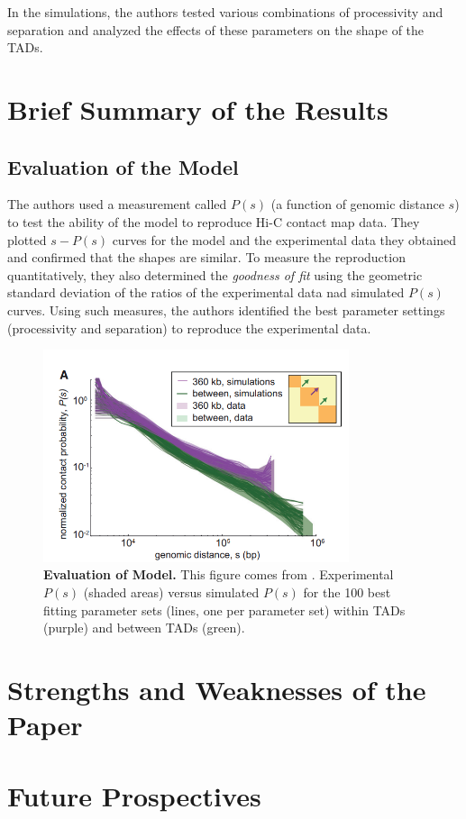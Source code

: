 \documentclass[11pt]{article}
\begin{document}
In the simulations, the authors tested various combinations of processivity and separation and analyzed the effects of these parameters on the shape of the TADs.

\section{Brief Summary of the Results}

\subsection{Evaluation of the Model}

The authors used a measurement called $P(s)$ (a function of genomic distance $s$) to test the ability of the model to reproduce Hi-C contact map data. They plotted $s-P(s)$ curves for the model and the experimental data they obtained and confirmed that the shapes are similar. To measure the reproduction quantitatively, they also determined the \textit{goodness of fit} using the geometric standard deviation of the ratios of the experimental data nad simulated $P(s)$ curves. Using such measures, the authors identified the best parameter settings (processivity and separation) to reproduce the experimental data.

\begin{figure}[htbp]
  \centering
  \includegraphics[width=0.8\textwidth]{assets/Snipaste_2023-01-13_17-49-12.png}
  \caption{\textbf{Evaluation of Model.} This figure comes from \cite{fudenberg_formation_2016}.  Experimental $P(s)$ (shaded areas) versus simulated $P(s)$ for the 100 best fitting parameter sets (lines, one per parameter set) within TADs (purple) and between
  TADs (green).}
  \label{fig:processivity and separation}
\end{figure}

\section{Strengths and Weaknesses of the Paper}

\section{Future Prospectives}

\printbibliography
\end{document}
